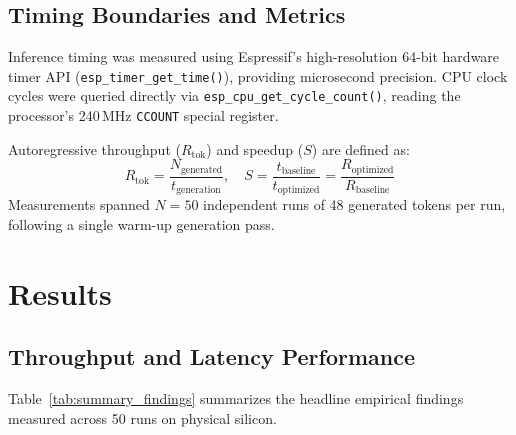 \documentclass[10pt,a4paper]{article}
\begin{document}
\subsection{Timing Boundaries and Metrics}
Inference timing was measured using Espressif's high-resolution 64-bit hardware timer API (\texttt{esp_timer_get_time()}), providing microsecond precision. CPU clock cycles were queried directly via \texttt{esp_cpu_get_cycle_count()}, reading the processor's 240\,MHz \texttt{CCOUNT} special register.

Autoregressive throughput ($R_{\text{tok}}$) and speedup ($S$) are defined as:
\begin{equation}
    R_{\text{tok}} = \frac{N_{\text{generated}}}{t_{\text{generation}}}, \quad S = \frac{t_{\text{baseline}}}{t_{\text{optimized}}} = \frac{R_{\text{optimized}}}{R_{\text{baseline}}}
\end{equation}
Measurements spanned $N=50$ independent runs of 48 generated tokens per run, following a single warm-up generation pass.

\section{Results}
\label{sec:results}

\subsection{Throughput and Latency Performance}
Table~\ref{tab:summary_findings} summarizes the headline empirical findings measured across 50 runs on physical silicon.
\end{document}
